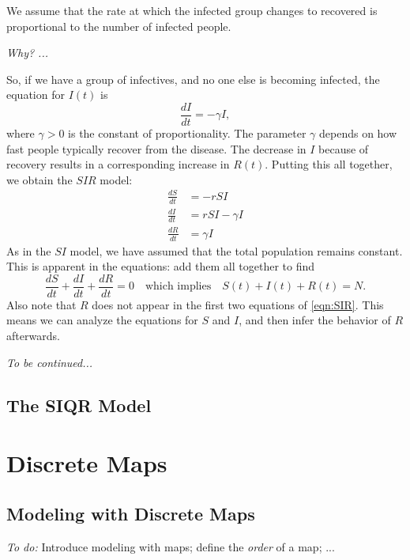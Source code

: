 \documentclass[reqno]{immbook}
\numberwithin{equation}{chapter}
\numberwithin{question}{section}
\numberwithin{theorem}{chapter}
\numberwithin{figure}{chapter}
\theoremstyle{definition}
\begin{document}
We assume that the rate at which the infected
group changes to recovered is proportional to
the number of infected people.

\emph{Why? ...}

So, if we have a group of infectives, and no
one else is becoming infected, the equation
for $I(t)$ is
\begin{equation}
  \frac{dI}{dt} = -\gamma I,
\end{equation}
where $\gamma > 0$ is the constant of proportionality.
The parameter $\gamma$ depends on how fast people
typically recover from the disease.
The decrease in $I$ because of recovery results
in a corresponding increase in $R(t)$.
Putting this all together, we obtain the
$SIR$ model:
\begin{equation}
\begin{split}
   \frac{dS}{dt} & = -r S I \\
   \frac{dI}{dt} & = r S I - \gamma I \\
   \frac{dR}{dt} & = \gamma I
\end{split}
\label{eqn:SIR}
\end{equation}
As in the $SI$ model, we have assumed that the total
population remains constant.  This is apparent in the equations:
add them all together to find
\begin{equation}
   \frac{dS}{dt} + \frac{dI}{dt} + \frac{dR}{dt} = 0
   \quad \textrm{which implies} \quad
   S(t) + I(t) + R(t) = N.
\end{equation}
Also note that $R$ does not appear in the first two equations
of \eqref{eqn:SIR}.  This means we can analyze the equations
for $S$ and $I$, and then infer the behavior of $R$ afterwards.

\medskip
\noindent
\emph{To be continued...}


\section{The SIQR Model}
%
%
%

\chapter{Discrete Maps}
%
\section{Modeling with Discrete Maps}
%
\emph{To do:} Introduce modeling with maps;
define the \emph{order} of a map; ...
\end{document}
